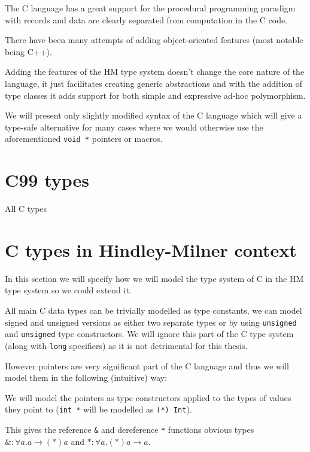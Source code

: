 The C language has a great support for the procedural programming paradigm with records and data are clearly separated from computation in the C code.

There have been many attempts of adding object-oriented features (most notable being C++).

Adding the features of the HM type system doesn't change the core nature of the language, it just facilitates creating generic abstractions and with the addition of type classes it adds support for both simple and expressive ad-hoc polymorphism.

We will present only slightly modified syntax of the C language which will give a type-safe alternative for many cases where we would otherwise use the aforementioned \lstinline{void *} pointers or macros.

\section{C99 types}


All C types

\section{C types in Hindley-Milner context}

In this section we will specify how we will model the type system of C in the HM type system so we could extend it.

All main C data types can be trivially modelled as type constants, we can model signed and unsigned versions as either two separate types or by using \lstinline{unsigned} and \lstinline{unsigned} type constructors. We will ignore this part of the C type system (along with \lstinline{long} specifiers) as it is not detrimental for this thesis.

However pointers are very significant part of the C language and thus we will model them in the following (intuitive) way:

We will model the pointers as type constructors applied to the types of values they point to (\lstinline{int *} will be modelled as \lstinline{(*) Int}).

This gives the reference \lstinline{&} and dereference \lstinline{*} functions obvious types $\&: \forall a . a \rightarrow (*) a$ and $*: \forall a . (*) a \rightarrow a$.

